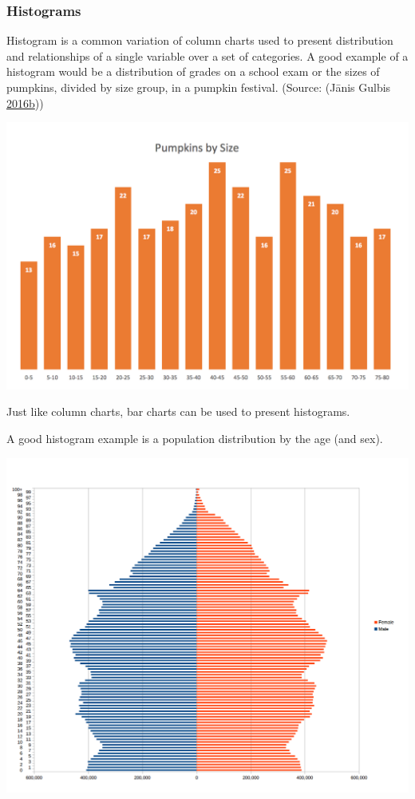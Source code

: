 \documentclass[]{book}
\begin{document}
\hypertarget{histograms}{%
\subsubsection{Histograms}\label{histograms}}

Histogram is a common variation of column charts used to present distribution and relationships of a single variable over a set of categories. A good example of a histogram would be a distribution of grades on a school exam or the sizes of pumpkins, divided by size group, in a pumpkin festival.
(Source: (Jānis Gulbis \protect\hyperlink{ref-pick_chart}{2016}\protect\hyperlink{ref-pick_chart}{b}))

\includegraphics{images/histogram-diag.png}

Just like column charts, bar charts can be used to present histograms.

A good histogram example is a population distribution by the age (and sex).

\includegraphics{images/bar-hist-diag.png}
\end{document}
